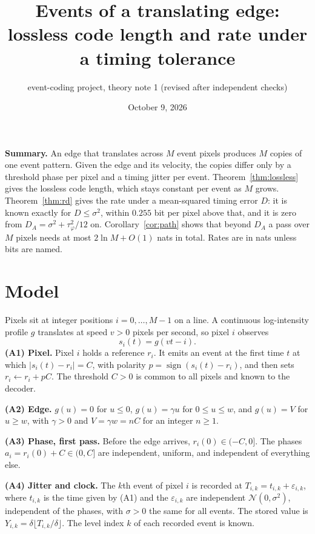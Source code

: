 \documentclass[10pt]{article}
\title{Events of a translating edge:\\ lossless code length and rate under a timing tolerance}
\author{event-coding project, theory note 1 (revised after independent checks)}
\date{October 9, 2026}
\theoremstyle{remark}
\newcommand{\tphi}{\tau_\varphi}
\begin{document}
\maketitle

\noindent\textbf{Summary.} An edge that translates across $M$ event pixels produces $M$ copies of
one event pattern. Given the edge and its velocity, the copies differ only by a threshold phase per
pixel and a timing jitter per event. Theorem~\ref{thm:lossless} gives the lossless code length,
which stays constant per event as $M$ grows. Theorem~\ref{thm:rd} gives the rate under a
mean-squared timing error $D$: it is known exactly for $D\le\sigma^2$, within $0.255$ bit per
pixel above that, and it is zero from $D_A=\sigma^2+\tphi^2/12$ on. Corollary~\ref{cor:path} shows
that beyond $D_A$ a pass over $M$ pixels needs at most $2\ln M+O(1)$ nats in total. Rates are in nats unless bits are named.

\section{Model}
Pixels sit at integer positions $i=0,\dots,M-1$ on a line. A continuous log-intensity profile $g$
translates at speed $v>0$ pixels per second, so pixel $i$ observes
\begin{equation}\label{eq:signal}
  s_i(t)=g(vt-i).
\end{equation}
\textbf{(A1) Pixel.} Pixel $i$ holds a reference $r_i$. It emits an event at the first time $t$ at
which $|s_i(t)-r_i|=C$, with polarity $p=\operatorname{sign}(s_i(t)-r_i)$, and then sets
$r_i\leftarrow r_i+pC$. The threshold $C>0$ is common to all pixels and known to the decoder.

\noindent\textbf{(A2) Edge.} $g(u)=0$ for $u\le 0$, $g(u)=\gamma u$ for $0\le u\le w$, and
$g(u)=V$ for $u\ge w$, with $\gamma>0$ and $V=\gamma w=nC$ for an integer $n\ge 1$.

\noindent\textbf{(A3) Phase, first pass.} Before the edge arrives, $r_i(0)\in(-C,0]$. The phases
$a_i=r_i(0)+C\in(0,C]$ are independent, uniform, and independent of everything else.

\noindent\textbf{(A4) Jitter and clock.} The $k$th event of pixel $i$ is recorded at
$T_{i,k}=t_{i,k}+\varepsilon_{i,k}$, where $t_{i,k}$ is the time given by (A1) and the
$\varepsilon_{i,k}$ are independent $\mathcal N(0,\sigma^2)$, independent of the phases, with
$\sigma>0$ the same for all events. The stored value is $Y_{i,k}=\delta\lfloor T_{i,k}/\delta\rfloor$.
The level index $k$ of each recorded event is known.
\end{document}
